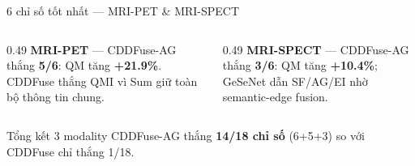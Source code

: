 \documentclass[t, aspectratio=169]{beamer}
\begin{document}
\begin{frame}{6 chỉ số tốt nhất --- MRI-PET \& MRI-SPECT}
    \begin{columns}[T]
        \begin{column}{0.49\textwidth}
            \small\textbf{MRI-PET} --- CDDFuse-AG thắng \textbf{5/6}:
            \vspace{0.2em}
            \vspace{0.2em}
            \small QM tăng \textbf{+21.9\%}. CDDFuse thắng QMI vì Sum giữ toàn bộ thông tin chung.
        \end{column}
        \begin{column}{0.49\textwidth}
            \small\textbf{MRI-SPECT} --- CDDFuse-AG thắng \textbf{3/6}:
            \vspace{0.2em}
            \vspace{0.2em}
            \small QM tăng \textbf{+10.4\%}; GeSeNet dẫn SF/AG/EI nhờ semantic-edge fusion.
        \end{column}
    \end{columns}
    \vspace{0.3em}
    \begin{alertblock}{\small Tổng kết 3 modality}
        \centering\small CDDFuse-AG thắng \textbf{14/18 chỉ số} (6+5+3) so với CDDFuse chỉ thắng 1/18.
    \end{alertblock}
\end{frame}
\end{document}
